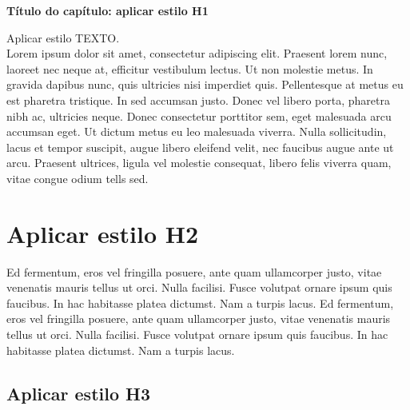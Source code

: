 \documentclass[10.5pt,a4paper]{article}
\begin{document}
\coveramz

\newpage

\secondpageamz

\newpage

{
\hypersetup{linkcolor = verde_amz2030}
\tableofcontents
}

\newpage




\setcounter{page}{1}
{\fontsize{23}{23}\selectfont  \textcolor{verde_amz2030}{ \textbf{Título do capítulo: aplicar estilo H1} }}

\vspace*{2cm}

Aplicar estilo TEXTO. \\

Lorem ipsum dolor sit amet, consectetur adipiscing elit. Praesent lorem nunc, laoreet nec neque at, efficitur vestibulum lectus. Ut non molestie metus. In gravida dapibus nunc, quis ultricies nisi imperdiet quis. Pellentesque at metus eu est pharetra tristique. In sed accumsan justo. Donec vel libero porta, pharetra nibh ac, ultricies neque. Donec consectetur porttitor sem, eget malesuada arcu accumsan eget. Ut dictum metus eu leo malesuada viverra. Nulla sollicitudin, lacus et tempor suscipit, augue libero eleifend velit, nec faucibus augue ante ut arcu. Praesent ultrices, ligula vel molestie consequat, libero felis viverra quam, vitae congue odium tells sed.


\section{Aplicar estilo H2}

Ed fermentum, eros vel fringilla posuere, ante quam ullamcorper justo, vitae venenatis mauris tellus ut orci. Nulla facilisi. Fusce volutpat ornare ipsum quis faucibus. In hac habitasse platea dictumst. Nam a turpis lacus. Ed fermentum, eros vel fringilla posuere, ante quam ullamcorper justo, vitae venenatis mauris tellus ut orci. Nulla facilisi. Fusce volutpat ornare ipsum quis faucibus. In hac habitasse platea dictumst. Nam a turpis lacus. 

\subsection{Aplicar estilo H3}
\end{document}
